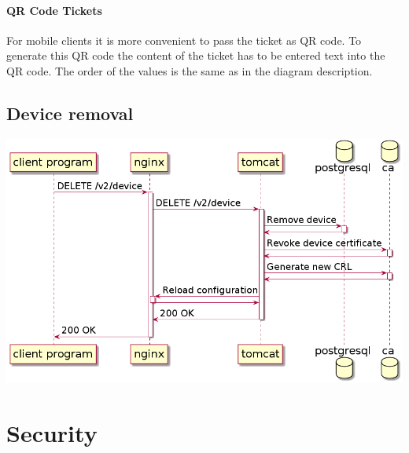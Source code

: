 \documentclass[12pt]{report}
\begin{document}
\paragraph{QR Code Tickets}
For mobile clients it is more convenient to pass the ticket as QR code. To generate this QR code the content of the ticket has to be
entered text into the QR code. The order of the values is the same as in the diagram description. 

\subsection{Device removal}

\includegraphics[width=\linewidth]{diagrams/remove-device.png}

\section{Security}
\end{document}
